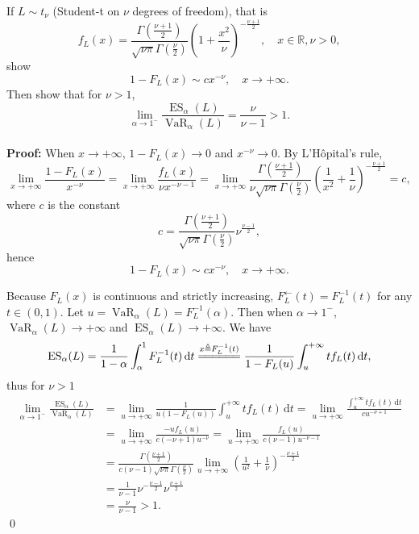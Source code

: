 \documentclass{MFM-hw} %
\newcommand{\VaR}{\operatorname{VaR}}
\newcommand{\ES}{\operatorname{ES}}
\newcommand{\real}{\mathbb{R}}
\newcommand{\dd}{\,\mathrm{d}}
\begin{document}
\HWproblem
If $L \sim t_{\nu}$ (Student-t on $\nu$ degrees of freedom), that is
\[
    f_L(x) = \frac{\Gamma(\frac{\nu+1}{2})}{\sqrt{\nu\pi}\Gamma(\frac{\nu}{2})}\left(1+\frac{x^2}{\nu}\right)^{-\frac{\nu+1}{2}},\quad x \in \real, \nu > 0,
\]
show
\[
    1-F_L(x) \sim cx^{-\nu}, \quad x \rightarrow +\infty.
\]
Then show that for $\nu > 1$,
\[
    \lim\limits_{\alpha \rightarrow 1^{-}} \frac{\ES_{\alpha}(L)}{\VaR_{\alpha}(L)} = \frac{\nu}{\nu-1} > 1.
\]\\

\textbf{Proof: }When $x \rightarrow + \infty$, $1-F_L(x) \rightarrow 0$ and $x^{-\nu} \rightarrow 0$. By L'Hôpital's rule,
\[
\lim\limits_{x \rightarrow +\infty} \frac{1-F_L(x)}{x^{-\nu}} = \lim\limits_{x \rightarrow +\infty} \frac{f_L(x)}{\nu x^{-\nu-1}} = \lim\limits_{x \rightarrow +\infty}\frac{\Gamma(\frac{\nu+1}{2})}{\nu\sqrt{\nu\pi}\Gamma(\frac{\nu}{2})} \left(\frac{1}{x^2} + \frac{1}{\nu} \right)^{-\frac{\nu+1}{2}} = c,
\]
where $c$ is the constant
\[
c = \frac{\Gamma(\frac{\nu+1}{2})}{\sqrt{\nu\pi}\Gamma(\frac{\nu}{2})} \nu^{\frac{\nu-1}{2}},
\]
hence
\[
    1-F_L(x) \sim cx^{-\nu}, \quad x \rightarrow +\infty.
\]

Because $F_L(x)$ is continuous and strictly increasing, $F_L^{\leftarrow}(t) = F_L^{-1}(t)$ for any $t \in (0,1)$. Let $u = \VaR_{\alpha}(L) = F_L^{-1}(\alpha)$. Then when $\alpha \rightarrow 1^{-}$, $\VaR_{\alpha}(L) \rightarrow +\infty$ and $\ES_{\alpha}(L) \rightarrow + \infty$. We have
\[
    \ES_{\alpha}(L) = \frac{1}{1-\alpha}\int_{\alpha}^1F_L^{-1}(t)\dd t \stackrel{x \triangleq F_L^{-1}(t)}{=\joinrel=\joinrel=\joinrel=\joinrel=\joinrel=} \frac{1}{1-F_L(u)}\int_{u}^{+\infty} tf_L(t)\dd t,
\]
thus for $\nu > 1$
\begin{align*}
    \lim\limits_{\alpha \rightarrow 1^{-}} \frac{\ES_{\alpha}(L)}{\VaR_{\alpha}(L)} &= \lim\limits_{u \rightarrow +\infty} \frac{1}{u(1-F_L(u))}\int_{u}^{+\infty} tf_L(t)\dd t = \lim\limits_{u \rightarrow +\infty} \frac{\int_{u}^{+\infty} tf_L(t)\dd t}{cu^{-\nu+1}}\\
    &=\lim\limits_{u \rightarrow +\infty} \frac{-u f_L(u)}{c(-\nu+1)u^{-\nu}} =\lim\limits_{u \rightarrow +\infty} \frac{f_L(u)}{c(\nu-1)u^{-\nu-1}}\\
    &=\frac{\Gamma(\frac{\nu+1}{2})}{c(\nu-1)\sqrt{\nu\pi}\Gamma(\frac{\nu}{2})}\lim\limits_{u \rightarrow +\infty}\left(\frac{1}{u^2} + \frac{1}{\nu}\right)^{-\frac{\nu+1}{2}}\\
    &=\frac{1}{\nu-1}\nu^{-\frac{\nu-1}{2}}\nu^{\frac{\nu+1}{2}}\\
    &=\frac{\nu}{\nu-1} > 1.
\end{align*}
\qed
\end{document}

